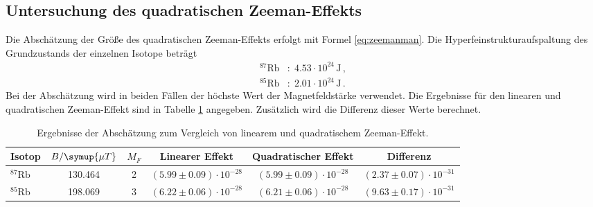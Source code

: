 \subsection{Untersuchung des quadratischen Zeeman-Effekts}
Die Abschätzung der Größe des quadratischen Zeeman-Effekts erfolgt mit Formel \eqref{eq:zeemanman}.
Die Hyperfeinstrukturaufspaltung des Grundzustands der einzelnen Isotope beträgt 
\begin{align*}
    ^{87}\text{Rb}&: \; 4.53 \cdot 10^{24} \, \si{\joule} \, , \\
    ^{85}\text{Rb}&: \; 2.01 \cdot 10^{24} \, \si{\joule} \, .
\end{align*}
Bei der Abschätzung wird in beiden Fällen der höchste Wert der Magnetfeldstärke verwendet.
Die Ergebnisse für den linearen und quadratischen Zeeman-Effekt sind in Tabelle \ref{tab:atab3} angegeben.
Zusätzlich wird die Differenz dieser Werte berechnet. 
\FloatBarrier
\begin{table}[h]
    \centering
    \caption{Ergebnisse der Abschätzung zum Vergleich von linearem und quadratischem Zeeman-Effekt.}
    \label{tab:atab3}
    \begin{tabular}{l c c c c c}
        \toprule
        {Isotop} & {$B / \symup{\mu T}$} & {$M_F$} & {Linearer Effekt} & {Quadratischer Effekt} & {Differenz} \\
        \midrule
        {$^{87}\text{Rb}$} & 130.464 & 2 & {$(5.99 \pm 0.09) \cdot 10^{-28}$} & {$(5.99 \pm 0.09) \cdot 10^{-28}$} & {$(2.37 \pm 0.07) \cdot 10^{-31}$} \\
        {$^{85}\text{Rb}$} & 198.069 & 3 & {$(6.22 \pm 0.06) \cdot 10^{-28}$} & {$(6.21 \pm 0.06) \cdot 10^{-28}$} & {$(9.63 \pm 0.17) \cdot 10^{-31}$} \\
        \bottomrule
    \end{tabular}
\end{table}
\FloatBarrier
\noindent

